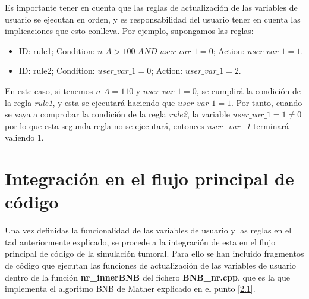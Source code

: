Es importante tener en cuenta que las reglas de actualización de las variables de usuario se ejecutan en orden, y es responsabilidad del usuario tener en cuenta las implicaciones que esto conlleva. Por ejemplo, supongamos las reglas:

\begin{itemize}
	\item ID: rule1; Condition: $n\_A > 100 \; AND \; user\_var\_1 = 0$; Action: $user\_var\_1 = 1$.
	\item ID: rule2; Condition: $user\_var\_1 = 0$; Action: $user\_var\_1 = 2$.
\end{itemize}

En este caso, si tenemos $n\_A = 110$ y $user\_var\_1 = 0$, se cumplirá la condición de la regla \textit{rule1}, y esta se ejecutará haciendo que $user\_var\_1 = 1$. Por tanto, cuando se vaya a comprobar la condición  de la regla \textit{rule2}, la variable $user\_var\_1 = 1 \neq 0$ por lo que esta segunda regla no se ejecutará, entonces \textit{user\_var\_1} terminará valiendo 1.

\section{Integración en el flujo principal de código}\label{4.5}

Una vez definidas la funcionalidad de las variables de usuario y las reglas en el \gls{tad} anteriormente explicado, se procede a la integración de esta en el flujo principal de código de la simulación tumoral. Para ello se han incluido fragmentos de código que ejecutan las funciones de actualización de las variables de usuario dentro de la función \textbf{nr\_innerBNB} del fichero \textbf{BNB\_nr.cpp}, que es la que implementa el algoritmo BNB de Mather\cite{Mather} explicado en el punto \ref{2.1}.

